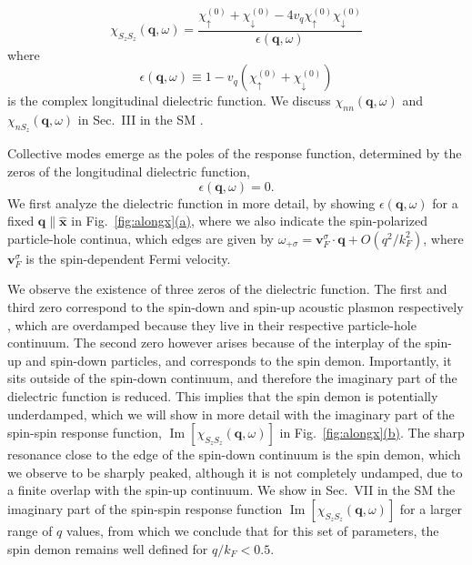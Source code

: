 \documentclass[aps,prl,reprint,twocolumns,superscriptaddress]{revtex4-2}
\DeclareMathOperator{\Imm}{Im}
\newcommand{\xx}{\hat{\bm{x}}}
\newcommand{\kF}{k_{F}}
\newcommand{\subfigref}[2]{Fig.~\hyperref[#1]{\ref*{#1}#2}}
\begin{document}
	\begin{equation}
		\chi_{S_zS_z}(\bm q,\omega)=\frac{\chi_\uparrow^{(0)}+\chi_\downarrow^{(0)}-4v_q\chi_\uparrow^{(0)}\chi_\downarrow^{(0)}}{\epsilon(\bm q,\omega)}
	\end{equation}
	where 
	\begin{equation}
		\epsilon(\bm q,\omega) \equiv 1 - v_q \left(\chi_\uparrow^{(0)}+\chi_\downarrow^{(0)}\right)
	\end{equation}
	is the complex longitudinal dielectric function. We discuss $\chi_{nn}(\bm q,\omega)$ and $\chi_{nS_z}(\bm q,\omega)$ in Sec.~III in the SM \cite{Note1}. 
	
	Collective modes emerge as the poles of the response function, determined by the zeros of the longitudinal dielectric function, 
	\begin{equation}
		\epsilon(\bm q,\omega) = 0. \label{eq:poles}
	\end{equation}
	We first analyze the dielectric function in more detail, by showing $\epsilon(\bm q,\omega)$ for a fixed $\bm q\parallel \xx$ in \subfigref{fig:alongx}{(a)}, where we also indicate the spin-polarized particle-hole continua, which edges are given by $\omega_{+\sigma}=\bm v_F^\sigma\cdot \bm q + O(q^2/\kF^2)$, where $\bm v_F^\sigma$ is the spin-dependent Fermi velocity.
	
	We observe the existence of three zeros of the dielectric function. The first and third zero correspond to the spin-down and spin-up acoustic plasmon respectively \cite{kamenevFieldTheoryNonEquilibrium2023}, which are overdamped because they live in their respective particle-hole continuum. The second zero however arises because of the interplay of the spin-up and spin-down particles, and corresponds to the spin demon. Importantly, it sits outside of the spin-down continuum, and therefore the imaginary part of the dielectric function is reduced. This implies that the spin demon is potentially underdamped, which we will show in more detail with the imaginary part of the spin-spin response function, $\Imm[\chi_{S_zS_z}(\bm q,\omega)]$ in \subfigref{fig:alongx}{(b)}. The sharp resonance close to the edge of the spin-down continuum is the spin demon, which we observe to be sharply peaked, although it is not completely undamped, due to a finite overlap with the spin-up continuum. We show in Sec.~VII in the SM \cite{Note1} the imaginary part of the spin-spin response function $\Imm[\chi_{S_zS_z}(\bm q,\omega)]$ for a larger range of $q$ values, from which we conclude that for this set of parameters, the spin demon remains well defined for $q/\kF<0.5$.
	
\end{document}
